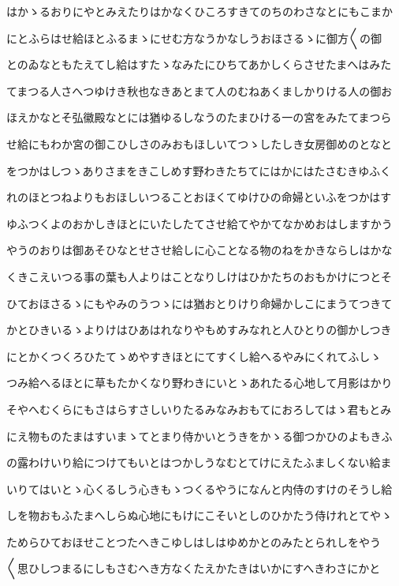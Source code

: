 \documentclass[a4paper,11pt,landscape]{ltjtarticle}
\begin{document}
はかゝるおりにやとみえたりはかなくひころすきてのちのわさなとにもこまか
\par\medskip
にとふらはせ給ほとふるまゝにせむ方なうかなしうおほさるゝに御方〱の御
\par\medskip
とのゐなともたえてし給はすたゝなみたにひちてあかしくらさせたまへはみた
\par\medskip
てまつる人さへつゆけき秋也なきあとまて人のむねあくましかりける人の御お
\par\medskip
ほえかなとそ弘徽殿なとには猶ゆるしなうのたまひける一の宮をみたてまつら
\par\medskip
せ給にもわか宮の御こひしさのみおもほしいてつゝしたしき女房御めのとなと
\par\medskip
をつかはしつゝありさまをきこしめす野わきたちてにはかにはたさむきゆふく
\par\medskip
れのほとつねよりもおほしいつることおほくてゆけひの命婦といふをつかはす
\par\medskip
ゆふつくよのおかしきほとにいたしたてさせ給てやかてなかめおはしますかう
\par\medskip
やうのおりは御あそひなとせさせ給しに心ことなる物のねをかきならしはかな
\par\medskip
くきこえいつる事の葉も人よりはことなりしけはひかたちのおもかけにつとそ
\par\medskip
ひておほさるゝにもやみのうつゝには猶おとりけり命婦かしこにまうてつきて
\par\medskip
かとひきいるゝよりけはひあはれなりやもめすみなれと人ひとりの御かしつき
\par\medskip
にとかくつくろひたてゝめやすきほとにてすくし給へるやみにくれてふしゝ
\par\medskip
つみ給へるほとに草もたかくなり野わきにいとゝあれたる心地して月影はかり
\par\medskip
そやへむくらにもさはらすさしいりたるみなみおもてにおろしてはゝ君もとみ
\par\medskip
にえ物ものたまはすいまゝてとまり侍かいとうきをかゝる御つかひのよもきふ
\par\medskip
の露わけいり給につけてもいとはつかしうなむとてけにえたふましくない給ま
\par\medskip
いりてはいとゝ心くるしう心きもゝつくるやうになんと内侍のすけのそうし給
\par\medskip
しを物おもふたまへしらぬ心地にもけにこそいとしのひかたう侍けれとてやゝ
\par\medskip
ためらひておほせことつたへきこゆしはしはゆめかとのみたとられしをやう
\par\medskip
〱思ひしつまるにしもさむへき方なくたえかたきはいかにすへきわさにかと
\end{document}
